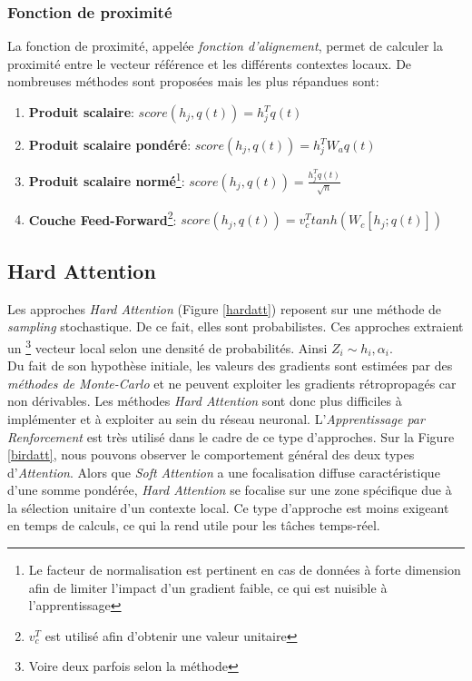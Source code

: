 \subsubsection{Fonction de proximité}
La fonction de proximité, appelée \textit{fonction d'alignement}, permet de calculer la proximité entre le vecteur référence et les différents contextes locaux. De nombreuses méthodes sont proposées mais les plus répandues sont:\\
\begin{enumerate}
    \item \textbf{Produit scalaire}: $score(h_j,q(t))=h_j^Tq(t)$
    \item \textbf{Produit scalaire pondéré}: $score(h_j,q(t))=h_j^TW_aq(t)$
    \item \textbf{Produit scalaire normé}\cite{attentionallneed}\footnote{Le facteur de normalisation est pertinent en cas de données à forte dimension afin de limiter l'impact d'un gradient faible, ce qui est nuisible à l'apprentissage}: $score(h_j,q(t))=\frac{h_j^Tq(t)}{\sqrt{n}}$
    \item \textbf{Couche Feed-Forward}\footnote{$v_c^T$ est utilisé afin d'obtenir une valeur unitaire}: $score(h_j,q(t))=v_c^Ttanh(W_c[h_j;q(t)])$
\end{enumerate}
\subsection{Hard Attention}
Les approches \textit{Hard Attention} (Figure \ref{hardatt}) reposent sur une méthode de \textit{sampling} stochastique. De ce fait, elles sont probabilistes. Ces approches extraient un \footnote{Voire deux parfois selon la méthode} vecteur local selon une densité de probabilités.  Ainsi $Z_i \sim h_i, \alpha_i$. \\

\noindent Du fait de son hypothèse initiale, les valeurs des gradients sont estimées par des \textit{méthodes de Monte-Carlo} et ne peuvent exploiter les gradients rétropropagés car non dérivables. Les méthodes \textit{Hard Attention} sont donc plus difficiles à implémenter et à exploiter au sein du réseau neuronal. L'\textit{Apprentissage par Renforcement} est très utilisé dans le cadre de ce type d'approches. Sur la Figure \ref{birdatt}, nous pouvons observer le comportement général des deux types d'\textit{Attention}. Alors que \textit{Soft Attention} a une focalisation diffuse caractéristique d'une somme pondérée, \textit{Hard Attention} se focalise sur une zone spécifique due à la sélection unitaire d'un contexte local. Ce type d'approche est moins exigeant en temps de calculs, ce qui la rend utile pour les tâches temps-réel.

